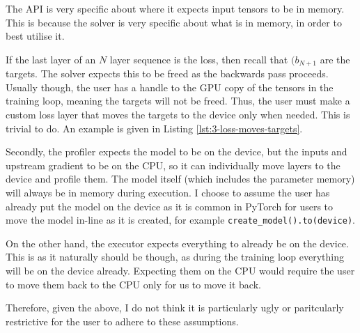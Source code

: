 
The API is very specific about where it expects input tensors to be in memory.
This is because the solver is very specific about what is in memory, in order to best utilise it.

If the last layer of an \(N\) layer sequence is the loss, then recall that \((b_{N+1}\) are the targets.
The solver expects this to be freed as the backwards pass proceeds.
Usually though, the user has a handle to the GPU copy of the tensors in the training loop, meaning the targets will not be freed.
Thus, the user must make a custom loss layer that moves the targets to the device only when needed.
This is trivial to do.
An example is given in Listing \ref{lst:3-loss-moves-targets}.


Secondly, the profiler expects the model to be on the device, but the inputs and upstream gradient to be on the CPU, so it can individually move layers to the device and profile them.
The model itself (which includes the parameter memory) will always be in memory during execution.
I choose to assume the user has already put the model on the device as it is common in PyTorch for users to move the model in-line as it is created, for example \texttt{create\_model().to(device)}.

On the other hand, the executor expects everything to already be on the device.
This is as it naturally should be though, as during the training loop everything will be on the device already.
Expecting them on the CPU would require the user to move them back to the CPU only for us to move it back.

Therefore, given the above, I do not think it is particularly ugly or paritcularly restrictive for the user to adhere to these assumptions.


